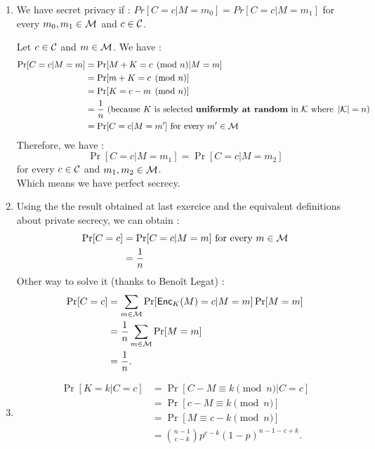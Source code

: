 \begin{solution}
  \begin{enumerate}
    \item
      We have secret privacy if : $Pr[C = c | M = m_0] = Pr[C = c | M = m_1] $ for every $m_0, m_1 \in \mathcal{M}$ and $c \in \mathcal{C}$.
      
      Let $c \in \mathcal{C}$ and $m\in \mathcal{M}$.
      We have :
      \begin{align*}
        \Pr[C = c | M = m]
        & = \Pr[M + K = c \pmod{n} | M = m]\\
        & = \Pr[m + K = c \pmod{n}]\\
        & = \Pr[K = c - m \pmod{n}]\\
        & = \frac{1}{n} \text{ (because $K$ is selected \textbf{uniformly at random} in } \mathcal{K} \text{ where } \left\lvert\mathcal{K}\right\lvert = n )\\
        & = \Pr[C = c | M = m'] \text{ for every } m' \in \mathcal{M}
      \end{align*}
      Therefore, we have :
      \[
        \Pr[C = c | M = m_1] = \Pr[C = c | M = m_2]
      \]
      for every $c \in \mathcal{C}$ and $m_1,m_2 \in \mathcal{M}$. \\
      Which means we have perfect secrecy.
    \item
        Using the the result obtained at last exercice and the equivalent definitions about private secrecy, we can obtain :
      \begin{align*}
          \Pr[C = c]  & = \Pr[C = c | M = m] \text{ for every } m \in \mathcal{M} \\
          & = \frac{1}{n}
      \end{align*}
      Other way to solve it (thanks to Benoît Legat) : 
      \begin{align*}
        \Pr[C = c]
        & = \sum_{m \in \mathcal{M}} \Pr[\operatorname{\mathsf{Enc}}_K(M) = c | M = m] \Pr[M = m]\\
        & = \frac{1}{n} \sum_{m \in \mathcal{M}} \Pr[M = m]\\
        & = \frac{1}{n}.
      \end{align*}
    \item
      \begin{align*}
        \Pr[K = k | C = c]
        & = \Pr[C - M \equiv k \pmod{n} | C = c]\\
        & = \Pr[c - M \equiv k \pmod{n}]\\
        & = \Pr[M \equiv c - k \pmod{n}]\\
        & = {n-1 \choose c-k} p^{c-k} (1-p)^{n-1-c+k}.
      \end{align*}
  \end{enumerate}
\end{solution}


